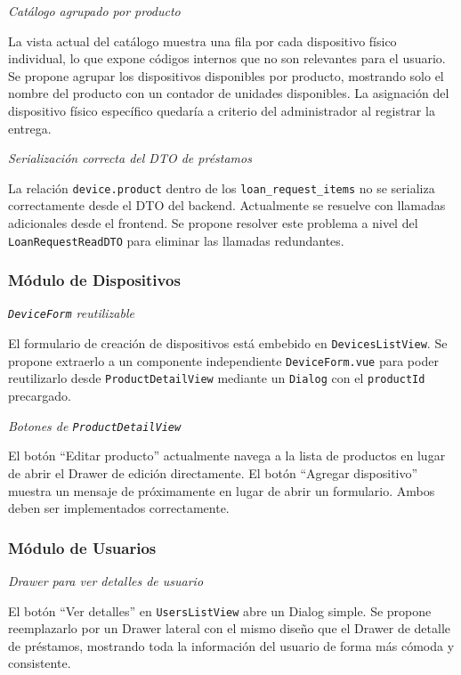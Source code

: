 \emph{Catálogo agrupado por producto}

La vista actual del catálogo muestra una fila por cada dispositivo físico individual, 
lo que expone códigos internos que no son relevantes para el usuario. Se propone 
agrupar los dispositivos disponibles por producto, mostrando solo el nombre del 
producto con un contador de unidades disponibles. La asignación del dispositivo 
físico específico quedaría a criterio del administrador al registrar la entrega.

\emph{Serialización correcta del DTO de préstamos}

La relación \texttt{device.product} dentro de los \texttt{loan\_request\_items} no 
se serializa correctamente desde el DTO del backend. Actualmente se resuelve con 
llamadas adicionales desde el frontend. Se propone resolver este problema a nivel del 
\texttt{LoanRequestReadDTO} para eliminar las llamadas redundantes.

\subsubsection*{Módulo de Dispositivos}

\emph{\texttt{DeviceForm} reutilizable}

El formulario de creación de dispositivos está embebido en \texttt{DevicesListView}. 
Se propone extraerlo a un componente independiente \texttt{DeviceForm.vue} para 
poder reutilizarlo desde \texttt{ProductDetailView} mediante un \texttt{Dialog} con 
el \texttt{productId} precargado.

\emph{Botones de \texttt{ProductDetailView}}

El botón ``Editar producto'' actualmente navega a la lista de productos en lugar de 
abrir el Drawer de edición directamente. El botón ``Agregar dispositivo'' muestra un 
mensaje de próximamente en lugar de abrir un formulario. Ambos deben ser 
implementados correctamente.

\subsubsection*{Módulo de Usuarios}

\emph{Drawer para ver detalles de usuario}

El botón ``Ver detalles'' en \texttt{UsersListView} abre un Dialog simple. Se propone 
reemplazarlo por un Drawer lateral con el mismo diseño que el Drawer de detalle de 
préstamos, mostrando toda la información del usuario de forma más cómoda y 
consistente.


